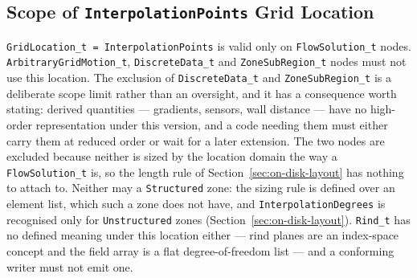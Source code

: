 \documentclass[11pt,letterpaper]{article}
\newif\ifvfourdraft
\newcommand{\vfour}[1]{\ifvfourdraft\textcolor{v4violet}{#1}\else#1\fi}
\begin{document}
\subsection{Scope of \texttt{InterpolationPoints} Grid Location}

{\sloppy
\texttt{GridLocation\_t = InterpolationPoints} is valid only on \texttt{FlowSolution\_t} nodes.
\texttt{ArbitraryGridMotion\_t}, \texttt{DiscreteData\_t} \vfour{and
\texttt{ZoneSubRegion\_t}} nodes must not use this location.
\vfour{The exclusion of \texttt{DiscreteData\_t} and \texttt{ZoneSubRegion\_t} is
a deliberate scope limit rather than an oversight, and it has a consequence worth
stating: derived quantities --- gradients, sensors, wall distance --- have no
high-order representation under this version, and a code needing them must either
carry them at reduced order or wait for a later extension.  The two nodes are
excluded because neither is sized by the location domain the way a
\texttt{FlowSolution\_t} is, so the length rule of
Section~\ref{sec:on-disk-layout} has nothing to attach to.}
\vfour{Neither may a \texttt{Structured} zone: the sizing rule is defined over an
element list, which such a zone does not have, and \texttt{InterpolationDegrees} is
recognised only for \texttt{Unstructured} zones (Section~\ref{sec:on-disk-layout}).
\texttt{Rind\_t} has no defined meaning under this location either --- rind planes
are an index-space concept and the field array is a flat degree-of-freedom list ---
and a conforming writer must not emit one.}
\par}
\end{document}
